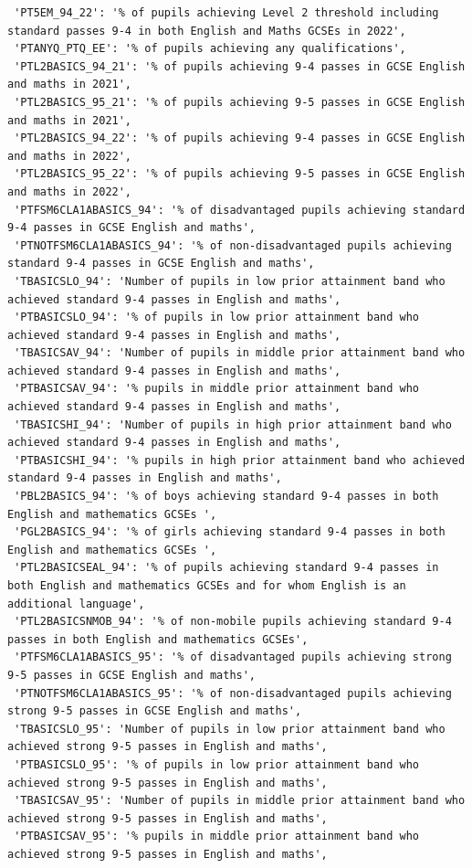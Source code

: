\documentclass[
  letterpaper,
  DIV=11,
  numbers=noendperiod]{scrartcl}
\begin{document}
\begin{verbatim}
 'PT5EM_94_22': '% of pupils achieving Level 2 threshold including standard passes 9-4 in both English and Maths GCSEs in 2022',
 'PTANYQ_PTQ_EE': '% of pupils achieving any qualifications',
 'PTL2BASICS_94_21': '% of pupils achieving 9-4 passes in GCSE English and maths in 2021',
 'PTL2BASICS_95_21': '% of pupils achieving 9-5 passes in GCSE English and maths in 2021',
 'PTL2BASICS_94_22': '% of pupils achieving 9-4 passes in GCSE English and maths in 2022',
 'PTL2BASICS_95_22': '% of pupils achieving 9-5 passes in GCSE English and maths in 2022',
 'PTFSM6CLA1ABASICS_94': '% of disadvantaged pupils achieving standard 9-4 passes in GCSE English and maths',
 'PTNOTFSM6CLA1ABASICS_94': '% of non-disadvantaged pupils achieving standard 9-4 passes in GCSE English and maths',
 'TBASICSLO_94': 'Number of pupils in low prior attainment band who achieved standard 9-4 passes in English and maths',
 'PTBASICSLO_94': '% of pupils in low prior attainment band who achieved standard 9-4 passes in English and maths',
 'TBASICSAV_94': 'Number of pupils in middle prior attainment band who achieved standard 9-4 passes in English and maths',
 'PTBASICSAV_94': '% pupils in middle prior attainment band who achieved standard 9-4 passes in English and maths',
 'TBASICSHI_94': 'Number of pupils in high prior attainment band who achieved standard 9-4 passes in English and maths',
 'PTBASICSHI_94': '% pupils in high prior attainment band who achieved standard 9-4 passes in English and maths',
 'PBL2BASICS_94': '% of boys achieving standard 9-4 passes in both English and mathematics GCSEs ',
 'PGL2BASICS_94': '% of girls achieving standard 9-4 passes in both English and mathematics GCSEs ',
 'PTL2BASICSEAL_94': '% of pupils achieving standard 9-4 passes in both English and mathematics GCSEs and for whom English is an additional language',
 'PTL2BASICSNMOB_94': '% of non-mobile pupils achieving standard 9-4 passes in both English and mathematics GCSEs',
 'PTFSM6CLA1ABASICS_95': '% of disadvantaged pupils achieving strong 9-5 passes in GCSE English and maths',
 'PTNOTFSM6CLA1ABASICS_95': '% of non-disadvantaged pupils achieving strong 9-5 passes in GCSE English and maths',
 'TBASICSLO_95': 'Number of pupils in low prior attainment band who achieved strong 9-5 passes in English and maths',
 'PTBASICSLO_95': '% of pupils in low prior attainment band who achieved strong 9-5 passes in English and maths',
 'TBASICSAV_95': 'Number of pupils in middle prior attainment band who achieved strong 9-5 passes in English and maths',
 'PTBASICSAV_95': '% pupils in middle prior attainment band who achieved strong 9-5 passes in English and maths',

\end{verbatim}
\end{document}
